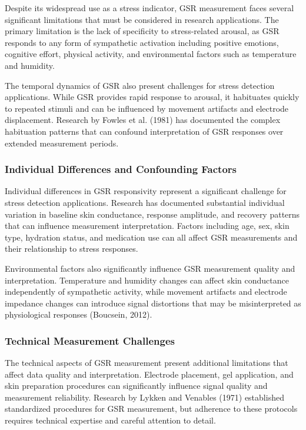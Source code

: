 \documentclass[12pt,a4paper]{article}
\begin{document}
Despite its widespread use as a stress indicator, GSR measurement faces several significant limitations that must be
considered in research applications. The primary limitation is the lack of specificity to stress-related arousal, as GSR
responds to any form of sympathetic activation including positive emotions, cognitive effort, physical activity, and
environmental factors such as temperature and humidity.

The temporal dynamics of GSR also present challenges for stress detection applications. While GSR provides rapid
response to arousal, it habituates quickly to repeated stimuli and can be influenced by movement artifacts and electrode
displacement. Research by Fowles et al. (1981) has documented the complex habituation patterns that can confound
interpretation of GSR responses over extended measurement periods.

\subsubsection{Individual Differences and Confounding Factors}

Individual differences in GSR responsivity represent a significant challenge for stress detection applications. Research
has documented substantial individual variation in baseline skin conductance, response amplitude, and recovery patterns
that can influence measurement interpretation. Factors including age, sex, skin type, hydration status, and medication
use can all affect GSR measurements and their relationship to stress responses.

Environmental factors also significantly influence GSR measurement quality and interpretation. Temperature and humidity
changes can affect skin conductance independently of sympathetic activity, while movement artifacts and electrode
impedance changes can introduce signal distortions that may be misinterpreted as physiological responses (Boucsein,
2012).

\subsubsection{Technical Measurement Challenges}

The technical aspects of GSR measurement present additional limitations that affect data quality and interpretation.
Electrode placement, gel application, and skin preparation procedures can significantly influence signal quality and
measurement reliability. Research by Lykken and Venables (1971) established standardized procedures for GSR measurement,
but adherence to these protocols requires technical expertise and careful attention to detail.
\end{document}
